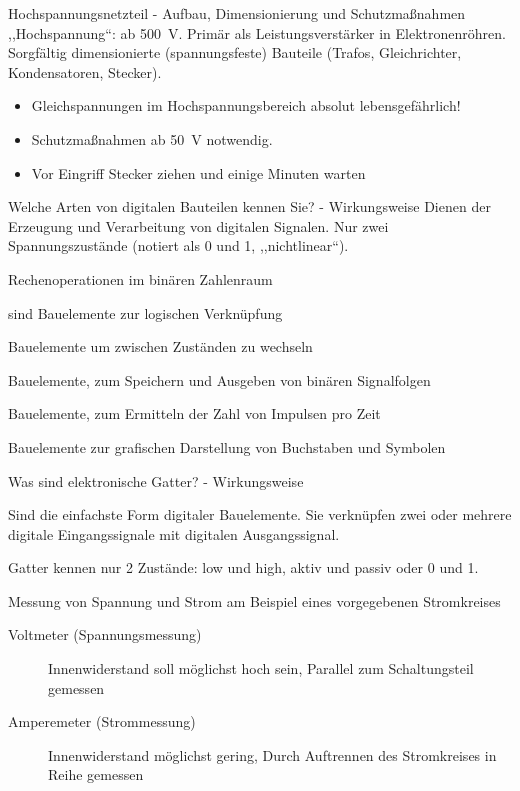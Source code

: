 \documentclass[avery5371,grid,frame,a4paper]{flashcards}
\newcommand{\card}[3]{
  \begin{flashcard}[{\chap} -- #1]{#2}#3\end{flashcard}
}
\begin{document}
\card{28}{Hochspannungsnetzteil - Aufbau, Dimensionierung und Schutzmaßnahmen}{
  ,,Hochspannung``: ab \SI{500}{\volt}.
  Primär als Leistungsverstärker in Elektronenröhren.
  Sorgfältig dimensionierte (spannungsfeste) Bauteile (Trafos, Gleichrichter, Kondensatoren, Stecker).

  \begin{itemize}\itemsep0pt
    \item Gleichspannungen im Hochspannungsbereich absolut lebensgefährlich!
    \item Schutzmaßnahmen ab \SI{50}{\volt} notwendig.
    \item Vor Eingriff Stecker ziehen und einige Minuten warten
  \end{itemize}
}
\card{29}{Welche Arten von digitalen Bauteilen kennen Sie? - Wirkungsweise}{
  \footnotesize
  Dienen der Erzeugung und Verarbeitung von digitalen Signalen.
  Nur zwei Spannungszustände (notiert als 0 und 1, ,,nichtlinear``).

  \begin{description}\itemsep0pt
    \item[Vorteile] Rechenoperationen im binären Zahlenraum
    \item[Gatter] sind Bauelemente zur logischen Verknüpfung
    \item[Kippstufen] Bauelemente um zwischen Zuständen zu wechseln
    \item[Puffer] Bauelemente, zum Speichern und Ausgeben von binären Signalfolgen
    \item[Zähler] Bauelemente, zum Ermitteln der Zahl von Impulsen pro Zeit
    \item[Anzeigen] Bauelemente zur grafischen Darstellung von Buchstaben und Symbolen
  \end{description}
}
\card{30}{Was sind elektronische Gatter? - Wirkungsweise}{
  \item
  Sind die einfachste Form digitaler Bauelemente.
  Sie verknüpfen zwei oder mehrere digitale Eingangssignale mit digitalen Ausgangssignal.

  \item
  Gatter kennen nur 2 Zustände: low und high, aktiv und passiv oder 0 und 1.
}
\card{31}{Messung von Spannung und Strom am Beispiel eines vorgegebenen Stromkreises}{
  \begin{description}
    \item[Voltmeter (Spannungsmessung)]
      Innenwiderstand soll möglichst hoch sein,
      Parallel zum Schaltungsteil gemessen
    \item[Amperemeter (Strommessung)]
      Innenwiderstand möglichst gering,
      Durch Auftrennen des Stromkreises in Reihe gemessen
  \end{description}
}
\end{document}
